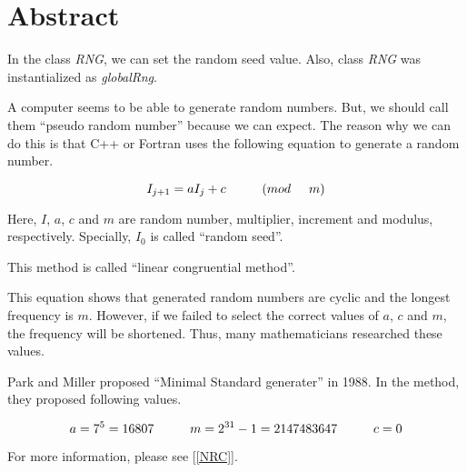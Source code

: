 %

\section{Abstract}

\noindent
In the class {\em RNG}, we can set the random seed value. Also, class
{\em RNG} was instantialized as {\em globalRng}.

\noindent
A computer seems to be able to generate random numbers. But, we should
call them ``pseudo random number'' because we can expect. The reason
why we can do this is that C++ or Fortran uses the following equation
to generate a random number.

\begin{equation}
I_{j+1} = a I_{j} + c \hspace{10mm} ( mod \hspace{5mm} m )
\end{equation}

\noindent
Here, $I$, $a$, $c$ and $m$ are random number, multiplier, increment
and modulus, respectively. Specially, $I_0$ is called ``random seed''.

\noindent
This method is called ``linear congruential method''.

\noindent
This equation shows that generated random numbers are cyclic and the
longest frequency is $m$. However, if we failed to select the correct
values of $a$, $c$ and $m$, the frequency will be shortened. Thus,
many mathematicians researched these values.

\noindent
Park and Miller proposed ``Minimal Standard generater'' in 1988. In
the method, they proposed following values.

\begin{equation}
a = 7^5 = 16807 \hspace{10mm} m = 2^{31} - 1 = 2147483647
\hspace{10mm} c = 0
\end{equation}

\noindent
For more information, please see [\ref{NRC}].

